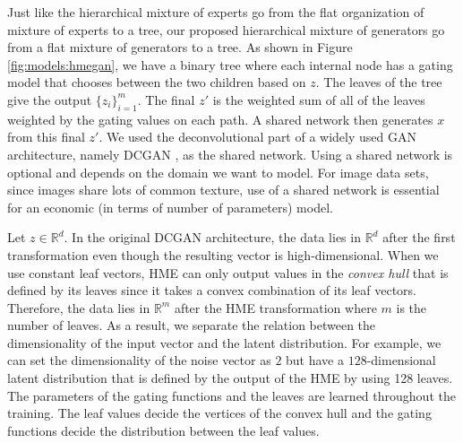 \documentclass[a4paper,onesided,12pt]{report}
\begin{document}
Just like the hierarchical mixture of experts \cite{hme} go from the flat organization of mixture of experts  \cite{me} to a tree, our proposed hierarchical mixture of generators go from a flat mixture of generators to a tree. As shown in Figure \ref{fig:models:hmegan}, we have a binary tree where each internal node has a gating model that chooses between the two children based on $z$. The leaves of the tree give the output $\{z_i\}_{i=1}^m$. The final $z'$ is the weighted sum of all of the leaves weighted by the gating values on each path. A shared network then generates $x$ from this final $z'$.  We used the deconvolutional part of a widely used GAN architecture, namely DCGAN \cite{dcgan}, as the shared network. Using a shared network is optional and depends on the domain we want to model. For image data sets, since images share lots of common texture, use of a shared network is essential for an economic (in terms of number of parameters) model.

Let $z \in \mathbb{R}^{d}$. In the original DCGAN architecture, the data lies in $\mathbb{R}^{d}$ after the first transformation even though the resulting vector is high-dimensional. When we use constant leaf vectors, HME can only output values in the \emph{convex hull} that is defined by its leaves since it takes a convex combination of its leaf vectors. Therefore, the data lies in $\mathbb{R}^m$ after the HME transformation where $m$ is the number of leaves. As a result, we separate the relation between the dimensionality of the input vector and the latent distribution. For example, we can set the dimensionality of the noise vector as $2$ but have a $128$-dimensional latent distribution that is defined by the output of the HME by using 128 leaves. The parameters of the gating functions and the leaves are learned throughout the training. The leaf values decide the vertices of the convex hull and the gating functions decide the distribution between the leaf values.
\end{document}
